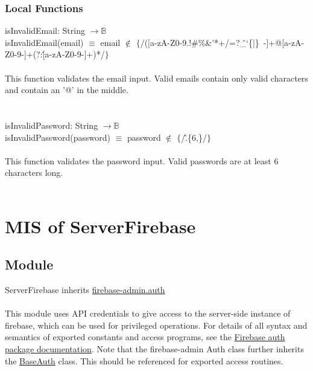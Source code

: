 \documentclass[12pt, titlepage]{article}
\begin{document}
\subsubsection{Local Functions}
isInvalidEmail: String $\rightarrow \mathbb{B}$  \\
isInvalidEmail(email) $\equiv$ email $\notin$ $\{$/([a-zA-Z0-9.!\#\%\&'*+/=?\^\_`\{|\}~-]+@[a-zA-Z0-9-]+(?:\.[a-zA-Z0-9-]+)*/$\}$ 
\\ \\
This function validates the email input. Valid emails contain only valid characters and contain an '@' in the middle. \\ 
\\
\\
isInvalidPassword: String $\rightarrow \mathbb{B}$  \\
isInvalidPassword(password) $\equiv$ password $\notin$ $\{$/\^.\{6,\}/$\}$ 
\\ \\
This function validates the password input. Valid passwords are at least 6 characters long. 
\\ \\
  
\medskip
\newpage
\section{MIS of ServerFirebase} \label{ServerFirebase} 

\subsection{Module}

ServerFirebase inherits \href{https://firebase.google.com/docs/reference/admin/node/firebase-admin.auth}{firebase-admin.auth} \\ \\
This module uses API credentials to give access to the server-side instance of firebase, which can be used for privileged operations. For details of all syntax and semantics of exported constants and access programs, see the \href{https://firebase.google.com/docs/reference/admin/node/firebase-admin.auth}{Firebase auth package documentation}. Note that the firebase-admin Auth class further inherits the \href{https://firebase.google.com/docs/reference/admin/node/firebase-admin.auth.baseauth.md#baseauth_class}{BaseAuth} class. This should be referenced for exported access routines. 
\end{document}
